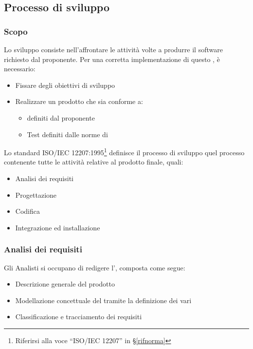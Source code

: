     \subsection{Processo di sviluppo}\label{PP:Sviluppo}

		\subsubsection{Scopo}\label{PP:Sviluppo:Scopo}
		Lo sviluppo consiste nell'affrontare le attività volte a produrre il software richiesto dal proponente.
		Per una corretta implementazione di questo , è necessario:
		\begin{itemize}
			\item Fissare degli obiettivi di sviluppo
			\item Realizzare un prodotto che sia conforme a:
			\begin{itemize}
				\item {} definiti dal proponente
				\item Test definiti dalle norme di 
			\end{itemize}
		\end{itemize}
		Lo standard ISO/IEC 12207:1995\footnote{Riferirsi alla voce ``ISO/IEC 12207'' in \S\ref{rifnorma}} definisce il processo di
		sviluppo quel processo contenente tutte le attività relative al prodotto finale, quali:
		\begin{itemize} %
			\item Analisi dei requisiti
			\item Progettazione
			\item Codifica
			\item Integrazione ed installazione
		\end{itemize}


        \subsubsection{Analisi dei requisiti}\label{PP:Sviluppo:AdR}
		Gli Analisti si occupano di redigere l'\Doc{\AdRv}, composta come segue:
		\begin{itemize}
			\item Descrizione generale del prodotto
			\item Modellazione concettuale del  tramite la definizione dei vari 
			\item Classificazione e tracciamento dei requisiti
		\end{itemize}

